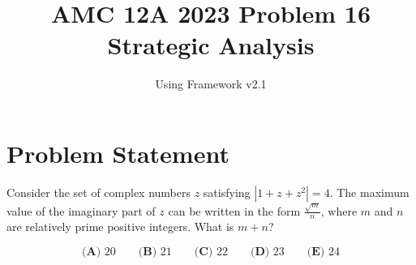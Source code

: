 \documentclass[11pt]{article}
\begin{document}
\title{\textbf{AMC 12A 2023 Problem 16}\\Strategic Analysis}
\author{Using Framework v2.1}
\date{}
\maketitle

\section*{Problem Statement}

Consider the set of complex numbers $z$ satisfying $|1+z+z^2|=4$. The maximum value of the imaginary part of $z$ can be written in the form $\frac{\sqrt{m}}{n}$, where $m$ and $n$ are relatively prime positive integers. What is $m+n$?

\[\textbf{(A) } 20 \qquad \textbf{(B) } 21 \qquad \textbf{(C) } 22 \qquad \textbf{(D) } 23 \qquad \textbf{(E) } 24\]
\end{document}
